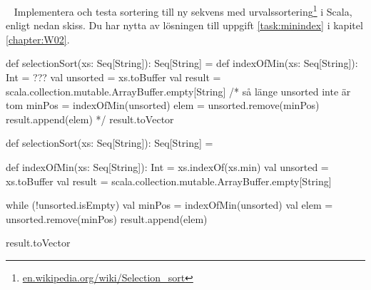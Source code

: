 






\QUESTEND



\clearpage




\QUESTBEGIN

\Task  \what~ Implementera och testa sortering till ny sekvens med urvalssortering\footnote{\href{https://en.wikipedia.org/wiki/Selection_sort}{en.wikipedia.org/wiki/Selection\_sort}} i Scala, enligt nedan skiss.  Du har nytta av lösningen till uppgift \ref{task:minindex} i kapitel \ref{chapter:W02}.
\begin{Code}
def selectionSort(xs: Seq[String]): Seq[String] = {
  def indexOfMin(xs: Seq[String]): Int = ???
  val unsorted = xs.toBuffer
  val result = scala.collection.mutable.ArrayBuffer.empty[String]
  /*
  så länge unsorted inte är tom {
    minPos = indexOfMin(unsorted)
    elem   = unsorted.remove(minPos)
    result.append(elem)
  }
  */
  result.toVector
}
\end{Code}



\SOLUTION


\TaskSolved \what


\begin{Code}
def selectionSort(xs: Seq[String]): Seq[String] = {
  def indexOfMin(xs: Seq[String]): Int = xs.indexOf(xs.min)
  val unsorted = xs.toBuffer
  val result = scala.collection.mutable.ArrayBuffer.empty[String]

  while (!unsorted.isEmpty) {
    val minPos = indexOfMin(unsorted)
    val elem = unsorted.remove(minPos)
    result.append(elem)
  }

  result.toVector
}
\end{Code}


